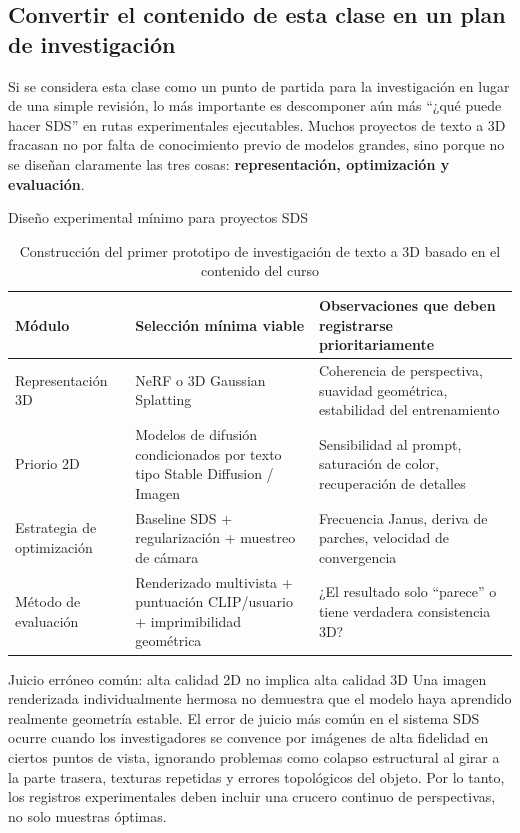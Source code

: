 \subsection{Convertir el contenido de esta clase en un plan de investigación}

Si se considera esta clase como un punto de partida para la investigación en lugar de una simple revisión, lo más importante es descomponer aún más ``¿qué puede hacer SDS'' en rutas experimentales ejecutables. Muchos proyectos de texto a 3D fracasan no por falta de conocimiento previo de modelos grandes, sino porque no se diseñan claramente las tres cosas: \textbf{representación, optimización y evaluación}.

\begin{knowledgebox}{Diseño experimental mínimo para proyectos SDS}
\begin{table}[H]
\centering
\begin{tabular}{p{} p{} p{}}
\toprule
Módulo & Selección mínima viable & Observaciones que deben registrarse prioritariamente \\
\midrule
Representación 3D & NeRF o 3D Gaussian Splatting & Coherencia de perspectiva, suavidad geométrica, estabilidad del entrenamiento \\
Priorio 2D & Modelos de difusión condicionados por texto tipo Stable Diffusion / Imagen & Sensibilidad al prompt, saturación de color, recuperación de detalles \\
Estrategia de optimización & Baseline SDS + regularización + muestreo de cámara & Frecuencia Janus, deriva de parches, velocidad de convergencia \\
Método de evaluación & Renderizado multivista + puntuación CLIP/usuario + imprimibilidad geométrica & ¿El resultado solo ``parece'' o tiene verdadera consistencia 3D? \\
\bottomrule
\end{tabular}
\caption{Construcción del primer prototipo de investigación de texto a 3D basado en el contenido del curso}
\end{table}
\end{knowledgebox}

\begin{warningbox}{Juicio erróneo común: alta calidad 2D no implica alta calidad 3D}
Una imagen renderizada individualmente hermosa no demuestra que el modelo haya aprendido realmente geometría estable. El error de juicio más común en el sistema SDS ocurre cuando los investigadores se convence por imágenes de alta fidelidad en ciertos puntos de vista, ignorando problemas como colapso estructural al girar a la parte trasera, texturas repetidas y errores topológicos del objeto. Por lo tanto, los registros experimentales deben incluir una crucero continuo de perspectivas, no solo muestras óptimas.
\end{warningbox}

